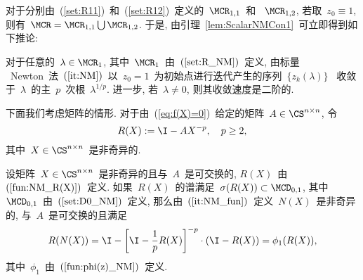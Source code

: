 对于分别由~(\ref{set:R11})~和~(\ref{set:R12})~定义的~$\MCR_{1,1}$~和
~$\MCR_{1,2}$, 若取~$z_0 \equiv 1$, 则有~$\MCR = \MCR_{1,1} \bigcup
\MCR_{1,2}$. 于是, 由引理~\ref{lem:ScalarNMCon1}~可立即得到如下推论:


\begin{corollary}
\label{cor:NM_zk_convergence1} %
%
对于任意的~$\lambda \in \MCR_1$,
其中~$\MCR_1$~由~$(\ref{set:R_NM})$~定义, 由标量
~Newton~法~$(\ref{it:NM})$~以~$z_0 =
1$~为初始点进行迭代产生的序列~$\{z_k(\lambda)\}$~
收敛于~$\lambda$~的主~$p$~次根~$\lambda^{1/p}$. 进一步, 若~$\lambda
\neq 0$, 则其收敛速度是二阶的.
\end{corollary}






下面我们考虑矩阵的情形. 对于由~(\ref{eq:f(X)=0})~给定的矩阵~$A \in
\CS^{n \times n}$, 令
\begin{equation}
\label{fun:NM_R(X)} R(X) := \I - A X^{-p}, \ \ \ p \geq 2,
\end{equation}
其中~$ X \in \CS^{n \times n}$~是非奇异的.

\begin{lemma}
\label{lem:R(N(X))_R(X)} %
%
设矩阵~$X \in \CS^{n\times n}$~是非奇异的且与~$A$~是可交换的,
$R(X)$~由~$(\ref{fun:NM_R(X)})$~定义.
如果~$R(X)$~的谱满足~$\sigma(R(X)) \subset \MCD_{0,1}$,
其中~$\MCD_{0,1}$~由~$(\ref{set:D0_NM})$~定义,
那么由~$(\ref{it:NM_fun})$~定义~$N(X)$~是非奇异的,
与~$A$~是可交换的且满足
\begin{equation}
\label{eq:R(N(X))} R(N(X)) = \I - \left[\I - \frac{1}{p}
R(X)\right]^{-p}\cdot(\I - R(X)) = \phi_1(R(X)),
\end{equation}
%
其中~$\phi_1$~由~$(\ref{fun:phi(z)_NM})$~定义.
\end{lemma}


